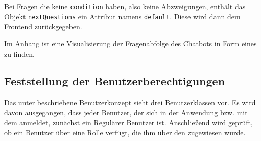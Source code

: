 Bei Fragen die keine \verb|condition| haben, also keine Abzweigungen, enthält das Objekt \verb|nextQuestions| ein Attribut namens \verb|default|. Diese wird dann dem Frontend zurückgegeben.

Im Anhang ist eine Visualisierung der Fragenabfolge des Chatbots in Form eines  zu finden.  

\subsection{Feststellung der Benutzerberechtigungen}
\label{sec:Planungsphase:Benutzerberechtigungen}

Das unter  beschriebene Benutzerkonzept sieht drei Benutzerklassen vor. Es wird davon ausgegangen, dass jeder Benutzer, der sich in der Anwendung bzw. mit dem  anmeldet, zunächst ein Regulärer Benutzer ist. Anschließend wird geprüft, ob ein Benutzer über eine Rolle verfügt, die ihm über den  zugewiesen wurde.

